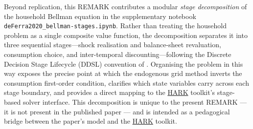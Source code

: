\documentclass[\latexroot/\projectname]{subfiles}
\begin{document}
Beyond replication, this REMARK contributes a modular \emph{stage decomposition} of the household Bellman equation in the supplementary notebook \texttt{deFerra2020\_\allowbreak{}bellman-stages.ipynb}. Rather than treating the household problem as a single composite value function, the decomposition separates it into three sequential stages---shock realisation and balance-sheet revaluation, consumption choice, and inter-temporal discounting---following the Discrete Decision Stage Lifecycle (DDSL) convention of \citet{Carroll2024-smd}. Organising the problem in this way exposes the precise point at which the endogenous grid method inverts the consumption first-order condition, clarifies which state variables carry across each stage boundary, and provides a direct mapping to the \href{https://github.com/econ-ark/HARK}{HARK} toolkit's stage-based solver interface. This decomposition is unique to the present REMARK --- it is not present in the published paper --- and is intended as a pedagogical bridge between the paper's model and the \href{https://github.com/econ-ark/HARK}{HARK} toolkit.

\smartbib
\end{document}

